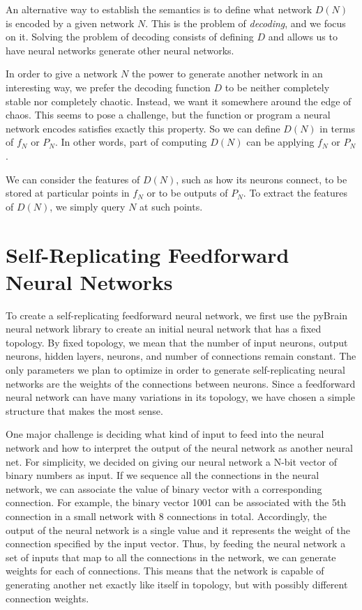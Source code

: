 \documentclass[12pt]{article}
\newcommand{\term}[1]{\emph{#1}}
\begin{document}
An alternative way to establish the semantics
is to define what network $D(N)$ is encoded
by a given network $N$.
This is the problem of \term{decoding},
and we focus on it.
Solving the problem of decoding
consists of defining $D$
and allows us to have neural networks
generate other neural networks.

In order to give a network $N$
the power to generate another network
in an interesting way,
we prefer the decoding function $D$
to be neither completely stable
nor completely chaotic.
Instead, we want it somewhere around the edge of chaos.%
\cite{langton1990edgechaos}%
\cite{bertschinger2004edgechaos}
This seems to pose a challenge,
but the function or program a neural network encodes
satisfies exactly this property.
So we can define $D(N)$ in terms of $f_N$ or $P_N$.
In other words, part of computing $D(N)$
can be applying $f_N$ or $P_N$.

We can consider the features of $D(N)$,
such as how its neurons connect,
to be stored at particular points
in $f_N$
or to be outputs of $P_N$.
To extract the features of $D(N)$,
we simply query $N$ at such points.

\section{Self-Replicating Feedforward Neural Networks}
\label{feedforward}

To create a self-replicating feedforward neural network, we first use the pyBrain neural network library \cite{schaul2010} to create an initial neural network that has a fixed topology. By fixed topology, we mean that the number of input neurons, output neurons, hidden layers, neurons, and number of connections remain constant. The only parameters we plan to optimize in order to generate self-replicating neural networks are  the weights of the connections between neurons. Since a feedforward neural network can have many variations in its topology, we have chosen a simple structure that makes the most sense. 

One major challenge is deciding what kind of input to feed into the neural network and how to interpret the output of the neural network as another neural net. For simplicity, we decided on giving our neural network a N-bit vector of binary numbers as input. If we sequence all the connections in the neural network, we can associate the value of binary vector with a corresponding connection. For example, the binary vector 1001 can be associated with the 5th connection in a small network with 8 connections in total. Accordingly, the output of the neural network is a single value and it represents the weight of the connection specified by the input vector. Thus, by feeding the neural network a set of inputs that map to all the connections in the network, we can generate weights for each of connections. This means that the network is capable of generating another net exactly like itself in topology, but with possibly different connection weights. 
\end{document}
